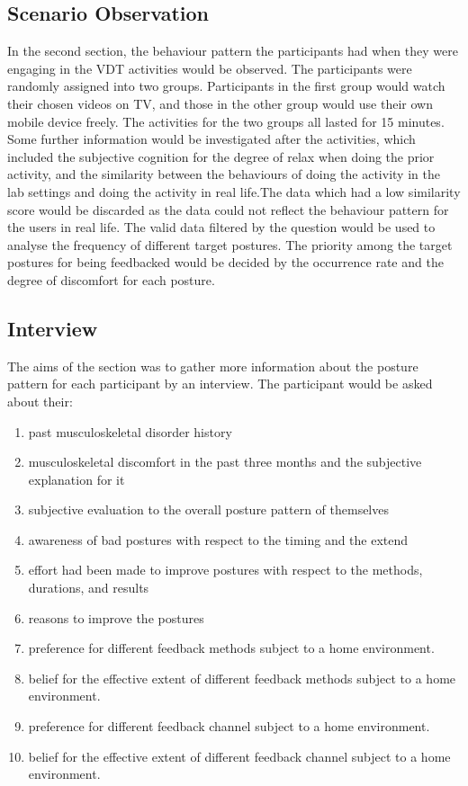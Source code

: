\subsection{Scenario Observation}
In the second section, the behaviour pattern the participants had when they were engaging in the VDT activities would be observed. The participants were randomly assigned into two groups. Participants in the first group would watch their chosen videos on TV, and those in the other group would use their own mobile device freely. The activities for the two groups all lasted for 15 minutes. Some further information would be investigated after the activities, which included the subjective cognition for the degree of relax when doing the prior activity, and the similarity between the behaviours of doing the activity in the lab settings and doing the activity in real life.The data which had a low similarity score would be discarded as the data could not reflect the behaviour pattern for the users in real life. The valid data filtered by the question would be used to analyse the frequency of different target postures. The priority among the target postures for being feedbacked would be decided by the occurrence rate and the degree of discomfort for each posture.

\subsection{Interview}
The aims of the section was to gather more information about the posture pattern for each participant by an interview. The participant would be asked about their:

\begin{enumerate}
\item past musculoskeletal disorder history
\item musculoskeletal discomfort in the past three months and the subjective explanation for it
\item subjective evaluation to the overall posture pattern of themselves
\item awareness of bad postures with respect to the timing and the extend
\item effort had been made to improve postures with respect to the methods, durations, and results
\item reasons to improve the postures
\item preference for different feedback methods subject to a home environment.
\item belief for the effective extent of different feedback methods subject to a home environment.
\item preference for different feedback channel subject to a home environment.
\item belief for the effective extent of different feedback channel subject to a home environment.
\end{enumerate}


